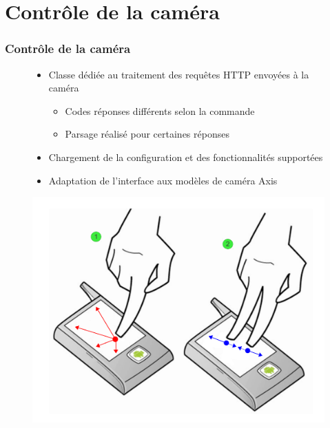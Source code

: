
\section{Contrôle de la caméra}
  \begin{frame}
   \frametitle{Contrôle de la caméra}


\begin{figure}[H]
  \centering
     \begin{itemize}
    \item Classe dédiée au traitement des requêtes HTTP envoyées à la caméra
    \begin{itemize}
      \item Codes réponses différents selon la commande
      \item Parsage réalisé pour certaines réponses
    \end{itemize}
    \item Chargement de la configuration et des fonctionnalités supportées
    \item Adaptation de l'interface aux modèles de caméra Axis
   	\end{itemize}
   \includegraphics[scale=0.25]{Images/ImageSlide8.pdf}
  \end{figure}  

  \end{frame}
